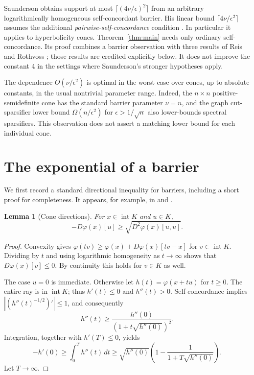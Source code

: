 \documentclass[11pt]{article}
\newtheorem{lemma}[theorem]{Lemma}
\newcommand{\intr}{\operatorname{int}}
\begin{document}
Saunderson \cite[Theorem~1.4]{Saunderson25} obtains support at most
$\lceil(4\nu/\epsilon)^2\rceil$ from an arbitrary logarithmically
homogeneous self-concordant barrier. His linear bound
$\lceil4\nu/\epsilon^2\rceil$ assumes the additional
\emph{pairwise-self-concordance} condition
\cite[Theorem~1.5]{Saunderson25}. In particular it applies to
hyperbolicity cones. Theorem~\ref{thm:main} needs only ordinary
self-concordance. Its proof combines a barrier observation with three
results of Reis and Rothvoss \cite{RR26}; those results are credited
explicitly below. It does not improve the constant $4$ in the settings
where Saunderson's stronger hypotheses apply.

The dependence $O(\nu/\epsilon^2)$ is optimal in the worst case over
cones, up to absolute constants, in the usual nontrivial parameter
range. Indeed, the $n\times n$ positive-semidefinite cone has the
standard barrier parameter $\nu=n$, and the graph cut-sparsifier lower
bound $\Omega(n/\epsilon^2)$ for $\epsilon>1/\sqrt n$
\cite{AKW14} also lower-bounds spectral sparsifiers. This observation
does not assert a matching lower bound for each individual cone.

\section{The exponential of a barrier}

We first record a standard directional inequality for barriers, including
a short proof for completeness. It appears, for example, in
\cite[Theorem~5.1.14]{Nesterov18} and
\cite[Lemma~2.3(ii)]{Saunderson25}.

\begin{lemma}[Cone directions]\label{lem:direction}
For $x\in\intr K$ and $u\in K$,
\begin{equation}\label{eq:direction}
 -D\varphi(x)[u]\ge \sqrt{D^2\varphi(x)[u,u]}.
\end{equation}
\end{lemma}
\begin{proof}
Convexity gives
$\varphi(tv)\ge\varphi(x)+D\varphi(x)[tv-x]$ for $v\in\intr K$.
Dividing by $t$ and using logarithmic homogeneity as $t\to\infty$
shows that $D\varphi(x)[v]\le0$. By continuity this holds for
$v\in K$ as well.

The case $u=0$ is immediate. Otherwise let $h(t)=\varphi(x+tu)$ for
$t\ge0$. The entire ray is in $\intr K$; thus $h'(t)\le0$ and
$h''(t)>0$. Self-concordance implies
$|(h''(t)^{-1/2})'|\le1$, and consequently
\[
 h''(t)\ge\frac{h''(0)}{(1+t\sqrt{h''(0)})^2}.
\]
Integration, together with $h'(T)\le0$, yields
\[
 -h'(0)\ge\int_0^T h''(t)\,dt
 \ge\sqrt{h''(0)}\left(1-
 \frac{1}{1+T\sqrt{h''(0)}}\right).
\]
Let $T\to\infty$.
\end{proof}
\end{document}
